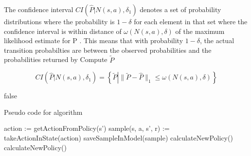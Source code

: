The confidence interval $CI(\hat{P} | N(s, a), \delta_1)$ denotes a set of probability distributions where the probability is $1 - \delta$ for each element in that set where the confidence interval is within distance of $\omega(N(s,a),\delta)$ of the maximum likelihood estimate for P \parencite{dietterich2013pac}. This means that with probability $1-\delta$, the actual transition probabilties are between the observed probabilities and the probabilities returned by Compute $\tilde{P}$   

\begin{equation}
\label{equation:balls_of_steels}
CI(\hat{P} | N(s, a), \delta_1)  = \left\{\tilde{P} \left| \|\tilde{P} - \hat{P}\|_1 \le \omega(N(s,a), \delta)\right.\right\}
\end{equation}





\label{goto}


\ifx false
\label{sec:agent:step}
\begin{algorithm}      
\caption{Pseudo code for algorithm}          
\begin{algorithmic}
\Loop
\State action := getActionFromPolicy(s')
\State sample(s, a, s', r) := takeActionInState(action) 
\State saveSampleInModel(sample)
\State calculateNewPolicy()
\EndIf
{}
\State calculateNewPolicy()
\EndIf
\EndLoop
\end{algorithmic}
\end{algorithm}
\fi

